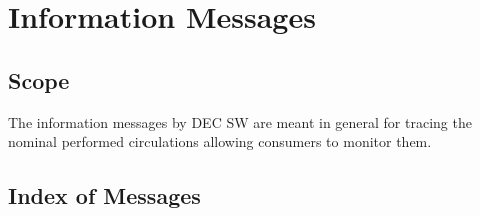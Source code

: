 \documentclass[dec_sum_main.tex]{subfiles}
\begin{document}

\section{Information Messages}

\subsection{Scope}
The information messages by DEC SW are meant in general for tracing the nominal performed circulations allowing consumers to monitor them.

\subsection{Index of Messages}
\end{document}
